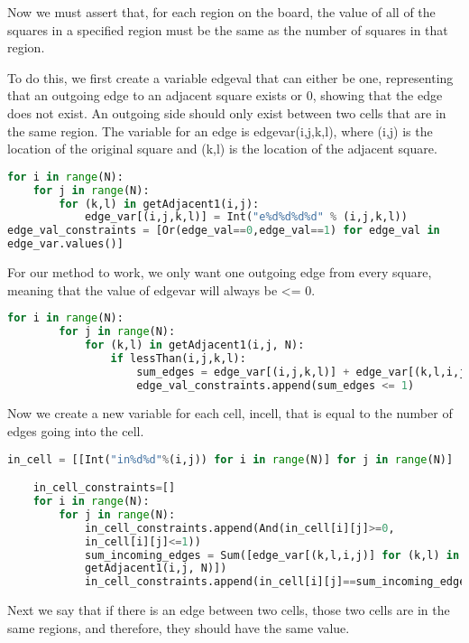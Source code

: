 Now we must assert that, for each region on the board, the value of
all of the squares in a specified region must be the same as the
number of squares in that region.
 

To do this, we first create a variable edgeval that can either be one,
representing that an outgoing edge to an adjacent square exists or 0,
showing that the edge does not exist. An outgoing side should only
exist between two cells that are in the same region. The variable for
an edge is edgevar(i,j,k,l), where (i,j) is the location of the
original square and (k,l) is the location of the adjacent square.


\begin{lstlisting}[language=python]
for i in range(N):
    for j in range(N):
        for (k,l) in getAdjacent1(i,j):
            edge_var[(i,j,k,l)] = Int("e%d%d%d%d" % (i,j,k,l))
edge_val_constraints = [Or(edge_val==0,edge_val==1) for edge_val in
edge_var.values()]
\end{lstlisting}

For our method to work, we only want one outgoing edge from every
square, meaning that the value of edgevar will always be <= 0.

\begin{lstlisting}[language=python]
for i in range(N):
        for j in range(N):
            for (k,l) in getAdjacent1(i,j, N):
                if lessThan(i,j,k,l):
                    sum_edges = edge_var[(i,j,k,l)] + edge_var[(k,l,i,j)]
                    edge_val_constraints.append(sum_edges <= 1)
\end{lstlisting}

Now we create a new variable for each cell, incell, that is equal to
the number of edges going into the cell.


\begin{lstlisting}[language=python]
in_cell = [[Int("in%d%d"%(i,j)) for i in range(N)] for j in range(N)]

    in_cell_constraints=[]
    for i in range(N):
        for j in range(N):
            in_cell_constraints.append(And(in_cell[i][j]>=0,
            in_cell[i][j]<=1))
            sum_incoming_edges = Sum([edge_var[(k,l,i,j)] for (k,l) in
            getAdjacent1(i,j, N)])
            in_cell_constraints.append(in_cell[i][j]==sum_incoming_edges)
\end{lstlisting}

Next we say that if there is an edge between two cells, those two
cells are in the same regions, and therefore, they should have the
same value.

